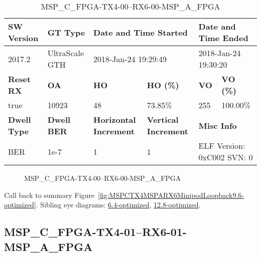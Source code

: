 \begin{table}[h]
\centering
\caption{MSP\_C\_FPGA-TX4-00--RX6-00-MSP\_A\_FPGA}
\label{tab:MSPCFPGATX400RX600MSPAFPGA9.6-optimized}
\begin{tabular}{@{}|l|l|l|l|l|l|@{}}
\toprule
\textbf{SW Version}                & \textbf{GT Type}   & \multicolumn{2}{l|}{\textbf{Date and Time Started}}            & \multicolumn{2}{l|}{\textbf{Date and Time Ended}}        \\ \midrule
2017.2                       & UltraScale GTH          & \multicolumn{2}{l|}{2018-Jan-24 19:29:49}                   & \multicolumn{2}{l|}{2018-Jan-24 19:30:20}               \\ \midrule
\textbf{Reset RX}                  & \textbf{OA} & \textbf{HO}   & \textbf{HO (\%)} & \textbf{VO} & \textbf{VO (\%)} \\ \midrule
true & 10923        & 48          & 73.85\%        & 255        & 100.00\%       \\ \midrule
\textbf{Dwell Type}                & \textbf{Dwell BER} & \textbf{Horizontal Increment} & \textbf{Vertical Increment}    & \multicolumn{2}{l|}{\textbf{Misc Info}}                  \\ \midrule
BER                            & 1e-7        & 1        & 1           & \multicolumn{2}{l|}{ELF Version: 0xC002 SVN: 0}                         \\ \bottomrule
\end{tabular}
\end{table}

\begin{figure}[h]
\caption{MSP\_C\_FPGA-TX4-00--RX6-00-MSP\_A\_FPGA} \label{fig:MSPCFPGATX400RX600MSPAFPGA9.6-optimized}
\end{figure}

Call back to summary Figure~\ref{fig:MSPCTX4MSPARX6MinipodLoopback9.6-optimized}.
Sibling eye diagrams: \hyperref[sec:MSPCFPGATX400RX600MSPAFPGA6.4-optimized]{6.4-optimized}, \hyperref[sec:MSPCFPGATX400RX600MSPAFPGA12.8-optimized]{12.8-optimized}.

\clearpage
\newpage


\subsection{MSP\_C\_FPGA-TX4-01--RX6-01-MSP\_A\_FPGA}\label{sec:MSPCFPGATX401RX601MSPAFPGA9.6-optimized}

